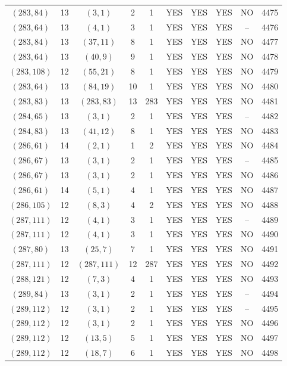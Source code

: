 \begin{longtable}{|c|c|c|c|c|c|c|c|c|c|}
$(283, 84)$ & 13 & $(3, 1)$ & 2 & 1 & YES & YES & YES & NO & 4475\\
$(283, 64)$ & 13 & $(4, 1)$ & 3 & 1 & YES & YES & YES & -- & 4476\\
$(283, 84)$ & 13 & $(37, 11)$ & 8 & 1 & YES & YES & YES & NO & 4477\\
$(283, 64)$ & 13 & $(40, 9)$ & 9 & 1 & YES & YES & YES & NO & 4478\\
$(283, 108)$ & 12 & $(55, 21)$ & 8 & 1 & YES & YES & YES & NO & 4479\\
$(283, 64)$ & 13 & $(84, 19)$ & 10 & 1 & YES & YES & YES & NO & 4480\\
$(283, 83)$ & 13 & $(283, 83)$ & 13 & 283 & YES & YES & YES & NO & 4481\\
$(284, 65)$ & 13 & $(3, 1)$ & 2 & 1 & YES & YES & YES & -- & 4482\\
$(284, 83)$ & 13 & $(41, 12)$ & 8 & 1 & YES & YES & YES & NO & 4483\\
$(286, 61)$ & 14 & $(2, 1)$ & 1 & 2 & YES & YES & YES & NO & 4484\\
$(286, 67)$ & 13 & $(3, 1)$ & 2 & 1 & YES & YES & YES & -- & 4485\\
$(286, 67)$ & 13 & $(3, 1)$ & 2 & 1 & YES & YES & YES & NO & 4486\\
$(286, 61)$ & 14 & $(5, 1)$ & 4 & 1 & YES & YES & YES & NO & 4487\\
$(286, 105)$ & 12 & $(8, 3)$ & 4 & 2 & YES & YES & YES & NO & 4488\\
$(287, 111)$ & 12 & $(4, 1)$ & 3 & 1 & YES & YES & YES & -- & 4489\\
$(287, 111)$ & 12 & $(4, 1)$ & 3 & 1 & YES & YES & YES & NO & 4490\\
$(287, 80)$ & 13 & $(25, 7)$ & 7 & 1 & YES & YES & YES & NO & 4491\\
$(287, 111)$ & 12 & $(287, 111)$ & 12 & 287 & YES & YES & YES & NO & 4492\\
$(288, 121)$ & 12 & $(7, 3)$ & 4 & 1 & YES & YES & YES & NO & 4493\\
$(289, 84)$ & 13 & $(3, 1)$ & 2 & 1 & YES & YES & YES & -- & 4494\\
$(289, 112)$ & 12 & $(3, 1)$ & 2 & 1 & YES & YES & YES & -- & 4495\\
$(289, 112)$ & 12 & $(3, 1)$ & 2 & 1 & YES & YES & YES & NO & 4496\\
$(289, 112)$ & 12 & $(13, 5)$ & 5 & 1 & YES & YES & YES & NO & 4497\\
$(289, 112)$ & 12 & $(18, 7)$ & 6 & 1 & YES & YES & YES & NO & 4498\\

\end{longtable}
